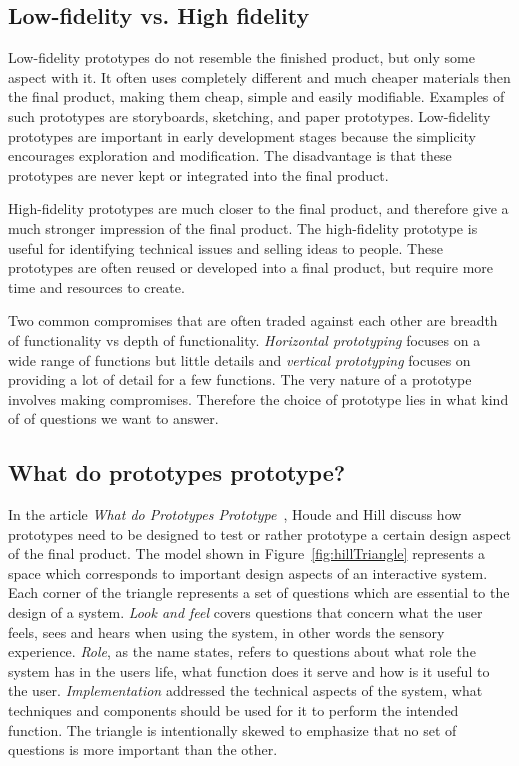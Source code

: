 \subsection{Low-fidelity vs. High fidelity}
Low-fidelity prototypes do not resemble the finished product, but only some aspect with it. It often uses completely different and much cheaper materials then the final product, making them cheap, simple and easily modifiable. Examples of such prototypes are storyboards, sketching, and paper prototypes. Low-fidelity prototypes are important in early development stages because the simplicity encourages exploration and modification. The disadvantage is that these prototypes are never kept or integrated into the final product.

High-fidelity prototypes are much closer to the final product, and therefore give a much stronger impression of the final product. The high-fidelity prototype is useful for identifying technical issues and selling ideas to people. These prototypes are often reused or developed into a final product, but require more time and resources to create.

Two common compromises that are often traded against each other are breadth of functionality vs depth of functionality. \textit{Horizontal prototyping} focuses on a wide range of functions but little details and \textit{vertical prototyping} focuses on providing a lot of detail for a few functions. The very nature of a prototype involves making compromises. Therefore the choice of prototype lies in what kind of of questions we want to answer. 

\subsection{What do prototypes prototype?}
\label{sec:prototypesPrototype}
In the article \textit{What do Prototypes Prototype}~\cite{prototypesPrototype}, Houde and Hill discuss how prototypes need to be designed to test or rather prototype a certain design aspect of the final product. The model shown in Figure~\ref{fig:hillTriangle} represents a space which corresponds to important design aspects of an interactive system. Each corner of the triangle represents a set of questions which are essential to the design of a system. \textit{Look and feel} covers questions that concern what the user feels, sees and hears when using the system, in other words the sensory experience. \textit{Role}, as the name states, refers to questions about what role the system has in the users life, what function does it serve and how is it useful to the user. \textit{Implementation} addressed the technical aspects of the system, what techniques and components should be used for it to perform the intended function. The triangle is intentionally skewed to emphasize that no set of questions is more important than the other.

